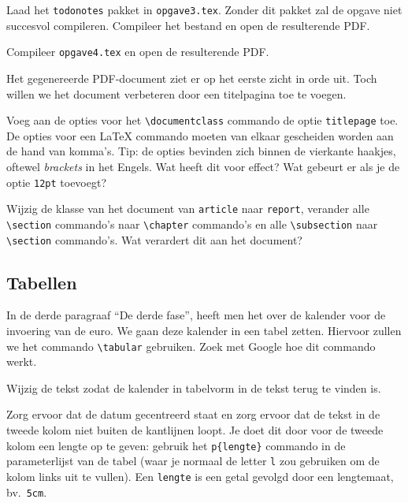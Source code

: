 \documentclass[12pt, dutch]{article}
\newcommand{\bs}{\textbackslash}
\begin{document}
\begin{tcolorbox}[title=Opgave 3]
  Laad het \texttt{todonotes} pakket in \texttt{opgave3.tex}. Zonder dit pakket zal de opgave niet
  succesvol compileren. Compileer het bestand en open de resulterende PDF.
\end{tcolorbox}


\begin{tcolorbox}[title=Opgave 4a]
  Compileer \texttt{opgave4.tex} en open de resulterende PDF.
\end{tcolorbox}

Het gegenereerde PDF-document ziet er op het eerste zicht in orde uit.
Toch willen we het document verbeteren door een titelpagina toe te voegen.


\begin{tcolorbox}[title=Opgave 4c]
  Voeg aan de opties voor het \texttt{\bs{}documentclass} commando de
  optie \texttt{titlepage} toe.  De opties voor een \LaTeX{} commando
  moeten van elkaar gescheiden worden aan de hand van komma's. Tip: de opties bevinden zich binnen de vierkante haakjes, oftewel \textit{brackets} in het Engels. Wat
  heeft dit voor effect?  Wat gebeurt er als je de optie \texttt{12pt}
  toevoegt?
\end{tcolorbox}
\begin{tcolorbox}[title=Opgave 4d]
  Wijzig de klasse van het document van \texttt{article} naar
  \texttt{report}, verander alle \texttt{\bs{}section} commando's naar
  \texttt{\bs{}chapter} commando's en alle \texttt{\bs{}subsection} naar
  \texttt{\bs{}section} commando's. Wat verardert dit aan het document?
\end{tcolorbox}

\subsection{Tabellen}

In de derde paragraaf ``De derde fase'', heeft men het over de
kalender voor de invoering van de euro. We gaan deze kalender in een
tabel zetten. Hiervoor zullen we het commando \texttt{\bs{}tabular}
gebruiken. Zoek met Google hoe dit commando werkt.
\begin{tcolorbox}[title=Opgave 5a]
  Wijzig de tekst zodat de kalender in tabelvorm in de tekst terug te vinden is.
\end{tcolorbox}
Zorg ervoor dat de datum gecentreerd staat en zorg ervoor dat de
tekst in de tweede kolom niet buiten de kantlijnen loopt. Je doet dit
door voor de tweede kolom een lengte op te geven: gebruik het
\texttt{p\{lengte\}} commando in de parameterlijst van de
tabel (waar je normaal de letter \texttt{l} zou gebruiken om de kolom
links uit te vullen). Een \texttt{lengte} is een getal gevolgd door een
lengtemaat, bv.\ \texttt{5cm}.
\end{document}
